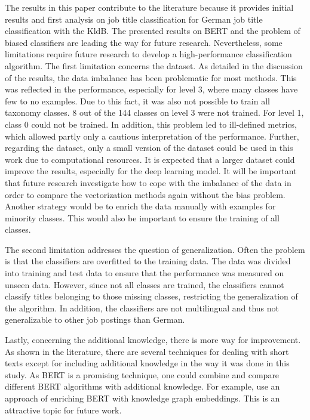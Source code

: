 \documentclass[12pt, a4paper, titlepage]{article}
\begin{document}
The results in this paper contribute to the literature because it provides initial results and first analysis on job title classification for German job title classification with the \ac{KldB}. The presented results on \ac{BERT} and the problem of biased classifiers are leading the way for future research. Nevertheless, some limitations require future research to develop a high-performance classification algorithm. The first limitation concerns the dataset. As detailed in the discussion of the results, the data imbalance has been problematic for most methods. This was reflected in the performance, especially for level 3, where many classes have few to no examples. Due to this fact, it was also not possible to train all taxonomy classes. 8 out of the 144 classes on level 3 were not trained. For level 1, class 0 could not be trained. In addition, this problem led to ill-defined metrics, which allowed partly only a cautious interpretation of the performance. Further, regarding the dataset, only a small version of the dataset could be used in this work due to computational resources. It is expected that a larger dataset could improve the results, especially for the deep learning model. It will be important that future research investigate how to cope with the imbalance of the data in order to compare the vectorization methods again without the bias problem. Another strategy would be to enrich the data manually with examples for minority classes. This would also be important to ensure the training of all classes.  

The second limitation addresses the question of generalization. Often the problem is that the classifiers are overfitted to the training data. The data was divided into training and test data to ensure that the performance was measured on unseen data. However, since not all classes are trained, the classifiers cannot classify titles belonging to those missing classes, restricting the generalization of the algorithm. In addition, the classifiers are not multilingual and thus not generalizable to other job postings than German.  

Lastly, concerning the additional knowledge, there is more way for improvement. As shown in the literature, there are several techniques for dealing with short texts except for including additional knowledge in the way it was done in this study. As \ac{BERT} is a promising technique, one could combine and compare different \ac{BERT} algorithms with additional knowledge. For example, \citet{ostendorff2019} use an approach of enriching \ac{BERT} with knowledge graph embeddings. This is an attractive topic for future work. 
\end{document}

